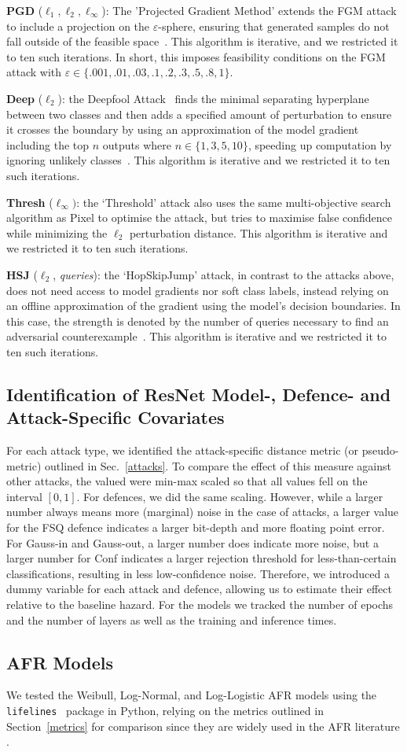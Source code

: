 \textbf{PGD}  ($\ell_1, \ell_2, \ell_{\infty}$): The 'Projected Gradient Method' extends the FGM attack to include a projection on the $\varepsilon$-sphere, ensuring that generated samples do not fall outside of the feasible space~\cite{madry2017towards}. This algorithm is iterative, and we restricted it to ten such iterations. In short, this imposes feasibility conditions on the FGM attack with $\varepsilon \in \{.001,.01,.03,.1,.2,.3,.5,.8,1\}$.

\textbf{Deep} ($\ell_2$): the Deepfool Attack~\cite{deepfool} finds the minimal separating hyperplane between two classes and then adds a specified amount of perturbation to ensure it crosses the boundary by using an approximation of the model gradient including the top $n$ outputs where $n \in \{1,3,5,10\}$, speeding up computation by ignoring unlikely classes~\cite{deepfool}. This algorithm is iterative and we restricted it to ten such iterations.

 \textbf{Thresh} ($\ell_{\infty})$: the `Threshold' attack also uses the same multi-objective search algorithm as Pixel to optimise the attack, but tries to maximise false confidence while minimizing the $\ell_2$ perturbation distance. This algorithm is iterative and we restricted it to ten such iterations.
 
\textbf{HSJ} ($\ell_2$, \textit{queries}): the `HopSkipJump' attack, in contrast to the attacks above, does not need access to model gradients nor soft class labels, instead relying on an offline approximation of the gradient using the model's decision boundaries. In this case, the strength is denoted by the number of queries necessary to find an adversarial counterexample~\cite{hopskipjump}. This algorithm is iterative and we restricted it to ten such iterations.

\subsection{Identification of ResNet Model-, Defence- and Attack-Specific Covariates}
For each attack type, we identified the attack-specific distance metric (or pseudo-metric) outlined in Sec.~\ref{attacks}. To compare the effect of this measure against other attacks, the valued were min-max scaled so that all values fell on the interval $[0,1]$. For defences, we did the same scaling. However, while a larger number always means more (marginal) noise in the case of attacks, a larger value for the FSQ defence indicates a larger bit-depth and more floating point error. For Gauss-in and Gauss-out, a larger number does indicate more noise, but a larger number for Conf indicates a larger rejection threshold for less-than-certain classifications, resulting in less low-confidence noise. Therefore, we introduced a dummy variable for each attack and defence, allowing us to estimate their effect relative to the baseline hazard. For the models we tracked the number of epochs and the number of layers as well as the training and inference times.  


\subsection{AFR Models}
We tested the Weibull, Log-Normal, and Log-Logistic AFR models using the \texttt{lifelines}~\cite{lifelines} package in Python, relying on the metrics outlined in Section~\ref{metrics} for comparison since they are widely used in the AFR literature \cite{aft_models}.
